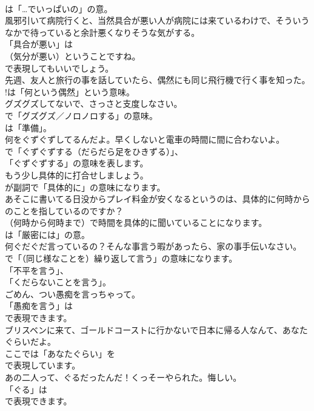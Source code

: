 \documentclass[8pt]{extreport}
\begin{document}
\begin{CJK}{UTF8}{min}
\\	は「…でいっぱいの」の意。	
\\	風邪引いて病院行くと、当然具合が悪い人が病院には来ているわけで、そういうなかで待っていると余計悪くなりそうな気がする。 
\\	「具合が悪い」は 
\\	（気分が悪い）ということですね。
\\	で表現してもいいでしょう。	
\\	先週、友人と旅行の事を話していたら、偶然にも同じ飛行機で行く事を知った。 
\\	!は「何という偶然」という意味。	
\\	グズグズしてないで、さっさと支度しなさい。 
\\	で「グズグズ／ノロノロする」の意味。
\\	は「準備」。	
\\	何をぐずぐずしてるんだよ。早くしないと電車の時間に間に合わないよ。 
\\	で「ぐずぐずする（だらだら足をひきずる）」、
\\	「ぐずぐずする」の意味を表します。	
\\	もう少し具体的に打合せしましょう。 
\\	が副詞で「具体的に」の意味になります。	
\\	あそこに書いてる日没からプレイ料金が安くなるというのは、具体的に何時からのことを指しているのですか？ 
\\	（何時から何時まで）で時間を具体的に聞いていることになります。
\\	は「厳密には」の意。	
\\	何ぐだぐだ言っているの？そんな事言う暇があったら、家の事手伝いなさい。 
\\	で「（同じ様なことを）繰り返して言う」の意味になります。
\\	「不平を言う」、
\\	「くだらないことを言う」。	
\\	ごめん、つい愚痴を言っちゃって。 
\\	「愚痴を言う」は
\\	で表現できます。	
\\	ブリスベンに来て、ゴールドコーストに行かないで日本に帰る人なんて、あなたぐらいだよ。 
\\	ここでは「あなたぐらい」を 
\\	で表現しています。	
\\	あの二人って、ぐるだったんだ！くっそーやられた。悔しい。 
\\	「ぐる」は
\\	で表現できます。

\end{CJK}
\end{document}
